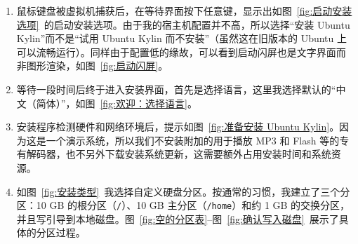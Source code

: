 \documentclass[cs4size,a4paper,nofonts]{ctexart}
\begin{document}
\begin{enumerate}
\begin{figure}[htp]
\end{figure}

\begin{figure}[htp]
\end{figure}

\item 鼠标键盘被虚拟机捕获后，在等待界面按下任意键，显示出如图~\ref{fig:启动安装选项}~的启动安装选项。由于我的宿主机配置并不高，所以选择“安装 Ubuntu Kylin”而不是“试用 Ubuntu Kylin 而不安装”（虽然这在旧版本的 Ubuntu 上可以流畅运行）。同样由于配置低的缘故，可以看到启动闪屏也是文字界面而非图形渲染，如图~\ref{fig:启动闪屏}。

\begin{figure}[htp]
\end{figure}

\item 等待一段时间后终于进入安装界面，首先是选择语言，这里我选择默认的“中文（简体）”，如图~\ref{fig:欢迎：选择语言}。

\item 安装程序检测硬件和网络环境后，提示如图~\ref{fig:准备安装 Ubuntu Kylin}。因为这是一个演示系统，所以我们不安装附加的用于播放 MP3 和 Flash 等的专有解码器，也不另外下载安装系统更新，这需要额外占用安装时间和系统资源。

\begin{figure}[htp]
\end{figure}

\item 如图~\ref{fig:安装类型}~我选择自定义硬盘分区。按通常的习惯，我建立了三个分区：10 GB 的根分区（\verb|/|）、10 GB 主分区（\verb|/home|）和约 1 GB 的交换分区，并且写引导到本地磁盘。图~\ref{fig:空的分区表}--图~\ref{fig:确认写入磁盘}~展示了具体的分区过程。

\begin{figure}[htp]
\end{figure}

\begin{figure}[htp]
\end{figure}


\end{enumerate}
\end{document}
